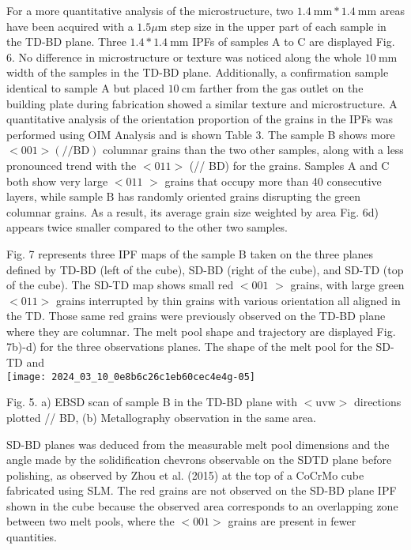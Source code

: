 \documentclass[10pt]{article}
\begin{document}
For a more quantitative analysis of the microstructure, two $1.4 \mathrm{~mm} * 1.4 \mathrm{~mm}$ areas have been acquired with a $1.5 \mu \mathrm{m}$ step size in the upper part of each sample in the TD-BD plane. Three $1.4 * 1.4 \mathrm{~mm}$ IPFs of samples $\mathrm{A}$ to $\mathrm{C}$ are displayed Fig. 6. No difference in microstructure or texture was noticed along the whole $10 \mathrm{~mm}$ width of the samples in the TD-BD plane. Additionally, a confirmation sample identical to sample A but placed $10 \mathrm{~cm}$ farther from the gas outlet on the building plate during fabrication showed a similar texture and microstructure. A quantitative analysis of the orientation proportion of the grains in the IPFs was performed using OIM Analysis and is shown Table 3. The sample B shows more $<001>(/ / \mathrm{BD})$ columnar grains than the two other samples, along with a less pronounced trend with the $<011>$ (// BD) for the grains. Samples A and C both show very large $<011$ $>$ grains that occupy more than 40 consecutive layers, while sample $\mathrm{B}$ has randomly oriented grains disrupting the green columnar grains. As a result, its average grain size weighted by area Fig. 6d) appears twice smaller compared to the other two samples.

Fig. 7 represents three IPF maps of the sample B taken on the three planes defined by TD-BD (left of the cube), SD-BD (right of the cube), and SD-TD (top of the cube). The SD-TD map shows small red $<001$ $>$ grains, with large green $<011>$ grains interrupted by thin grains with various orientation all aligned in the TD. Those same red grains were previously observed on the TD-BD plane where they are columnar. The melt pool shape and trajectory are displayed Fig. 7b)-d) for the three observations planes. The shape of the melt pool for the SD-TD and\\
\texttt{[image: 2024\_03\_10\_0e8b6c26c1eb60cec4e4g-05]}

Fig. 5. a) EBSD scan of sample B in the TD-BD plane with $<\mathrm{uvw}>$ directions plotted // BD, (b) Metallography observation in the same area.

SD-BD planes was deduced from the measurable melt pool dimensions and the angle made by the solidification chevrons observable on the SDTD plane before polishing, as observed by Zhou et al. (2015) at the top of a CoCrMo cube fabricated using SLM. The red grains are not observed on the SD-BD plane IPF shown in the cube because the observed area corresponds to an overlapping zone between two melt pools, where the $<001>$ grains are present in fewer quantities.
\end{document}
